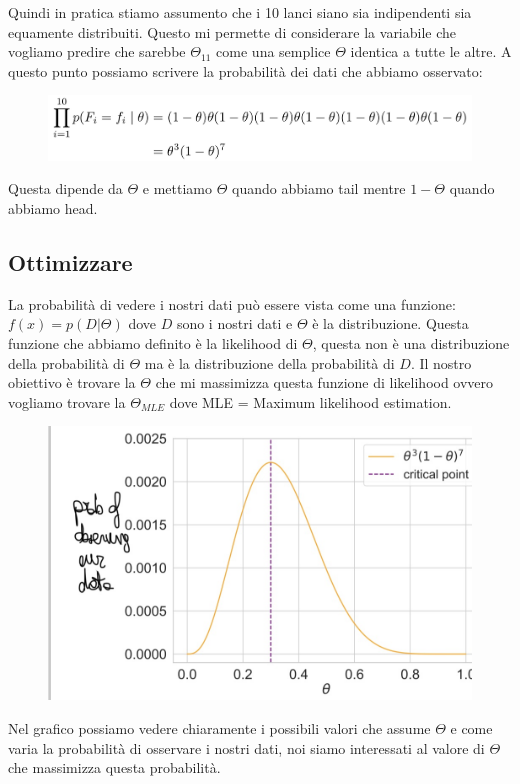 \documentclass[14pt]{extreport}
\begin{document}
Quindi in pratica stiamo assumento che i 10 lanci siano sia indipendenti sia equamente distribuiti. Questo mi permette di considerare la variabile che
vogliamo predire che sarebbe $\Theta_{11}$ come una semplice $\Theta$ identica a tutte le altre. A questo punto possiamo scrivere la probabilità dei
dati che abbiamo osservato:
\begin{figure}[H]
\centering
  \includegraphics[width=0.80\linewidth]{14.jpeg}
\end{figure}
Questa dipende da $\Theta$ e mettiamo $\Theta$ quando abbiamo tail mentre $1-\Theta$ quando abbiamo head.\\

\subsection{Ottimizzare}
La probabilità di vedere i nostri dati può essere vista come una funzione: $f(x) = p(D|\Theta)$ dove $D$ sono i nostri dati e $\Theta$ è la
distribuzione. Questa funzione che abbiamo definito è la likelihood di $\Theta$, questa non è una distribuzione della probabilità di $\Theta$ ma è la
distribuzione della probabilità di $D$. Il nostro obiettivo è trovare la $\Theta$ che mi massimizza questa funzione di likelihood ovvero vogliamo
trovare la $\Theta_{MLE}$ dove MLE = Maximum likelihood estimation.
\begin{figure}[H]
\centering
  \includegraphics[width=0.7\linewidth]{15.jpeg}
\end{figure}

Nel grafico possiamo vedere chiaramente i possibili valori che assume $\Theta$ e come varia la probabilità di osservare i nostri dati, noi siamo
interessati al valore di $\Theta$ che massimizza questa probabilità.
\end{document}
